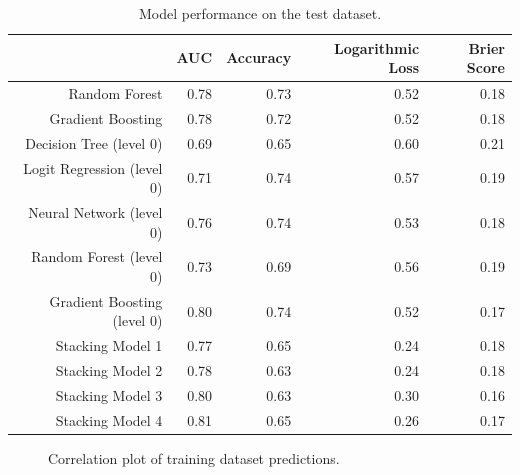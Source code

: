 \documentclass[12pt]{article}
\begin{document}
\begin{table}[ht]
\centering
\begin{tabular}{rrrrr}
  \hline
 & AUC & Accuracy & Logarithmic Loss & Brier Score \\ 
  \hline
Random Forest & 0.78 & 0.73 & 0.52 & 0.18 \\ 
  Gradient Boosting & 0.78 & 0.72 & 0.52 & 0.18 \\
\hline 
  Decision Tree (level 0) & 0.69 & 0.65 & 0.60 & 0.21 \\ 
  Logit Regression (level 0) & 0.71 & 0.74 & 0.57 & 0.19 \\ 
  Neural Network (level 0) & 0.76 & 0.74 & 0.53 & 0.18 \\ 
  Random Forest (level 0) & 0.73 & 0.69 & 0.56 & 0.19 \\ 
  Gradient Boosting (level 0) & 0.80 & 0.74 & 0.52 & 0.17 \\ 
\hline
  Stacking Model 1 & 0.77 & 0.65 & 0.24 & 0.18 \\ 
  Stacking Model 2 & 0.78 & 0.63 & 0.24 & 0.18 \\ 
  Stacking Model 3 & 0.80 & 0.63 & 0.30 & 0.16 \\ 
  Stacking Model 4 & 0.81 & 0.65 & 0.26 & 0.17 \\ 
   \hline
\end{tabular}
\caption{Model performance on the test dataset.}\label{eval}
\end{table}

\begin{figure}[htp] 
\caption{Correlation plot of training dataset predictions.}\label{corrgram}
\end{figure}  
\end{document}
